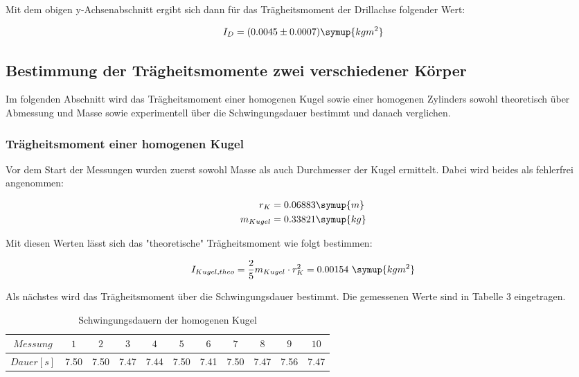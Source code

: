 Mit dem obigen y-Achsenabschnitt ergibt sich dann für das Trägheitsmoment der Drillachse folgender Wert:

\begin{equation}
  I_D = (0.0045 \pm 0.0007) \symup{kg m^2}
\end{equation}

\subsection{Bestimmung der Trägheitsmomente zwei verschiedener Körper}
Im folgenden Abschnitt wird das Trägheitsmoment einer homogenen Kugel sowie einer
homogenen Zylinders sowohl theoretisch über Abmessung und Masse sowie experimentell über
die Schwingungsdauer bestimmt und danach verglichen.

\subsubsection{Trägheitsmoment einer homogenen Kugel}
Vor dem Start der Messungen wurden zuerst sowohl Masse als auch Durchmesser der Kugel ermittelt.
Dabei wird beides als fehlerfrei angenommen:

\begin{align}
  r_K &= 0.06883 \symup{m} \\
  m_{Kugel} &= 0.33821 \symup{kg}
\end{align}

Mit diesen Werten lässt sich das "theoretische" Trägheitsmoment wie folgt bestimmen:

\begin{equation}
  I_{Kugel,theo} = \frac{2}{5} m_{Kugel} \cdot r_K^2 = 0.00154 \,\, \symup{kg m^2}
\end{equation}

Als nächstes wird das Trägheitsmoment über die Schwingungsdauer bestimmt. Die gemessenen Werte
sind in Tabelle 3 eingetragen.

\begin{table}
  \centering
  \caption{Schwingungsdauern der homogenen Kugel}
  \begin{tabular}{c c c c c c c c c c c}
    \toprule $Messung$ & $1$ & $2$ & $3$ & $4$ & $5$ & $6$ & $7$ & $8$ & $9$ & $10$ \\
    \midrule $Dauer [s]$ & 7.50 & 7.50 & 7.47 & 7.44 & 7.50 & 7.41 & 7.50 & 7.47 & 7.56 & 7.47\\
    \bottomrule
  \end{tabular}
\end{table}

